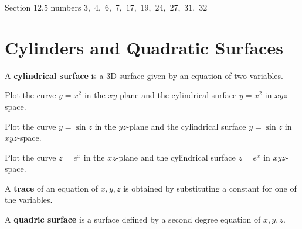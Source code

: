 \documentclass[letterpaper, twoside, 12pt]{book}
\begin{document}
\begin{suggestedHW}
  Section $12.5$ numbers $3,$ $4,$ $6,$ $7,$ $17,$ $19,$ $24,$ $27,$ $31,$ $32$
\end{suggestedHW}




\section{Cylinders and Quadratic Surfaces}

\begin{definition}
  A \textbf{cylindrical surface} is a 3D surface given by an
  equation of two variables.
\end{definition}

          \begin{problem}
            Plot the curve $y=x^2$ in the $xy$-plane and the
            cylindrical surface $y=x^2$ in $xyz$-space.
          \end{problem}

          \begin{solution}

          \end{solution}

          \begin{problem}
            Plot the curve $y=\sin z$ in the $yz$-plane and the
            cylindrical surface $y=\sin z$ in $xyz$-space.
          \end{problem}

          \begin{solution}

          \end{solution}

          \begin{problem}
            Plot the curve $z=e^x$ in the $xz$-plane and the
            cylindrical surface $z=e^x$ in $xyz$-space.
          \end{problem}

          \begin{solution}

          \end{solution}

\begin{definition}
  A \textbf{trace} of an equation of $x,y,z$ is obtained by substituting
  a constant for one of the variables.
\end{definition}

\begin{definition}
  A \textbf{quadric surface} is a surface defined by a second
  degree equation of $x,y,z$.
\end{definition}
\end{document}
